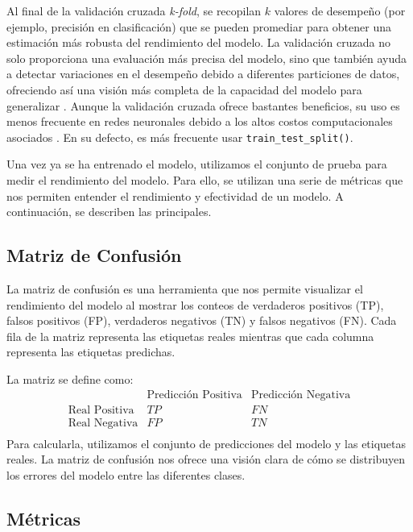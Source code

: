 Al final de la validación cruzada \textit{k-fold}, se recopilan $k$ valores de desempeño (por ejemplo, precisión en clasificación) que se pueden promediar para obtener una estimación más robusta del rendimiento del modelo. La validación cruzada no solo proporciona una evaluación más precisa del modelo, sino que también ayuda a detectar variaciones en el desempeño debido a diferentes particiones de datos, ofreciendo así una visión más completa de la capacidad del modelo para generalizar \citep{muller2016introduction}. Aunque la validación cruzada ofrece bastantes beneficios, su uso es menos frecuente en redes neuronales debido a los altos costos computacionales asociados \citep{geron2022hands}. En su defecto, es más frecuente usar \lstinline|train_test_split()|.



Una vez ya se ha entrenado el modelo, utilizamos el conjunto de prueba para medir el rendimiento del modelo. Para ello, se utilizan una serie de métricas que nos permiten entender el rendimiento y efectividad de un modelo. A continuación, se describen las principales.

\subsection{Matriz de Confusión}

La matriz de confusión es una herramienta que nos permite visualizar el rendimiento del modelo al mostrar los conteos de verdaderos positivos (TP), falsos positivos (FP), verdaderos negativos (TN) y falsos negativos (FN). Cada fila de la matriz representa las etiquetas reales mientras que cada columna representa las etiquetas predichas.

La matriz se define como:
\[
\begin{array}{c|cc}
 & \text{Predicción Positiva} & \text{Predicción Negativa} \\
\hline
\text{Real Positiva} & TP & FN \\
\text{Real Negativa} & FP & TN \\
\end{array}
\]
Para calcularla, utilizamos el conjunto de predicciones del modelo y las etiquetas reales. La matriz de confusión nos ofrece una visión clara de cómo se distribuyen los errores del modelo entre las diferentes clases.

\subsection{Métricas}

